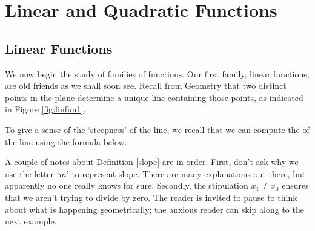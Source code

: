 \section{Linear and Quadratic Functions}
\subsection{Linear Functions}

\label{LinearFunctions}

We now begin the study of families of functions.  Our first family, linear functions, are old friends as we shall soon see.  Recall from Geometry that two distinct points in the plane determine a unique line containing those points, as indicated in Figure \ref{fig:linfun1}.


To give a sense of the `steepness' of the line, we recall that we can compute the  of the line using the formula below.

\smallskip


\smallskip

A couple of notes about Definition \ref{slope} are in order.  First, don't ask why we use the letter `$m$' to represent slope.  There are many explanations out there, but apparently no one really knows for sure. Secondly, the stipulation  $x_{1} \neq x_{0}$ ensures that we aren't trying to divide by zero.  The reader is invited to pause to think about what is happening geometrically; the anxious reader can skip along to the next example.


\medskip


